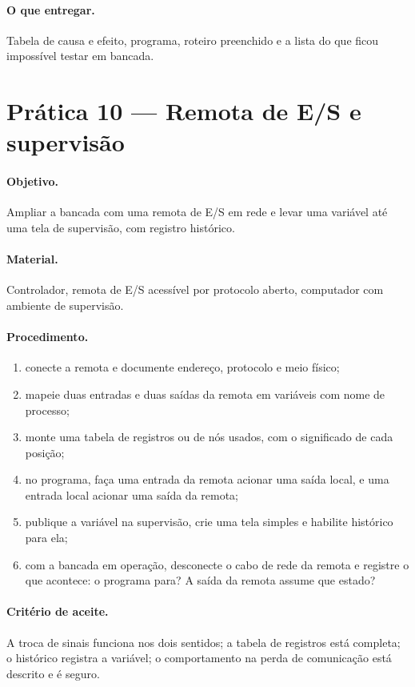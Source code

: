 \paragraph{O que entregar.} Tabela de causa e efeito, programa, roteiro preenchido e a lista do que
ficou impossível testar em bancada.

\section{Prática 10 --- Remota de E/S e supervisão}

\paragraph{Objetivo.} Ampliar a bancada com uma remota de E/S em rede e levar uma variável até uma
tela de supervisão, com registro histórico.

\paragraph{Material.} Controlador, remota de E/S acessível por protocolo aberto, computador com
ambiente de supervisão.

\paragraph{Procedimento.}
\begin{enumerate}
  \item conecte a remota e documente endereço, protocolo e meio físico;
  \item mapeie duas entradas e duas saídas da remota em variáveis com nome de processo;
  \item monte uma tabela de registros ou de nós usados, com o significado de cada posição;
  \item no programa, faça uma entrada da remota acionar uma saída local, e uma entrada local acionar
        uma saída da remota;
  \item publique a variável na supervisão, crie uma tela simples e habilite histórico para ela;
  \item com a bancada em operação, desconecte o cabo de rede da remota e registre o que acontece: o
        programa para? A saída da remota assume que estado?
\end{enumerate}

\paragraph{Critério de aceite.} A troca de sinais funciona nos dois sentidos; a tabela de registros
está completa; o histórico registra a variável; o comportamento na perda de comunicação está descrito
e é seguro.

